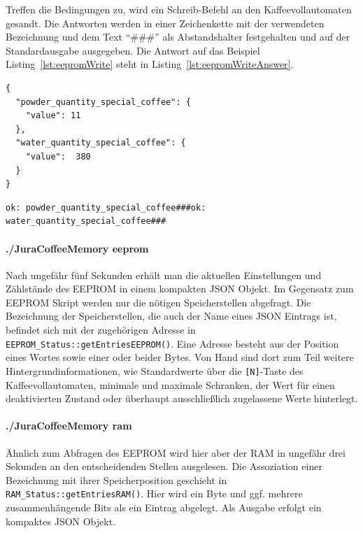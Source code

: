 Treffen die Bedingungen zu, wird ein Schreib-Befehl an den Kaffeevollautomaten gesandt.
Die Antworten werden in einer Zeichenkette mit der verwendeten Bezeichnung und dem Text "`\#\#\#"' als Abstandshalter festgehalten und auf der Standardausgabe ausgegeben.
Die Antwort auf das Beispiel Listing~\ref{lst:eepromWrite} steht in Listing~\ref{lst:eepromWriteAnswer}.

\begin{lstlisting}[label=lst:eepromWrite,caption={Beispiel einer JSON Eingabe für./JuraCoffeeMemory eepromWrite}]
{
  "powder_quantity_special_coffee": {
    "value": 11
  },
  "water_quantity_special_coffee": {
    "value":  380
  }
}
\end{lstlisting}

\begin{lstlisting}[label=lst:eepromWriteAnswer,caption={Antwort auf das Beispiel der JSON Eingabe}]
ok: powder_quantity_special_coffee###ok: water_quantity_special_coffee###
\end{lstlisting}

\paragraph{./JuraCoffeeMemory eeprom}
Nach ungefähr fünf Sekunden erhält man die aktuellen Einstellungen und Zählstände des \ac{EEPROM} in einem kompakten \ac{JSON} Objekt.
Im Gegensatz zum EEPROM Skript werden nur die nötigen Speicherstellen abgefragt.
Die Bezeichnung der Speicherstellen, die auch der Name eines \ac{JSON} Eintrags ist, befindet sich mit der zugehörigen Adresse in \texttt{EEPROM\_Status::getEntriesEEPROM()}.
Eine Adresse besteht aus der Position eines Wortes sowie einer oder beider Bytes.
Von Hand sind dort zum Teil weitere Hintergrundinformationen, wie Standardwerte über die \texttt{[N]}-Taste des Kaffeevollautomaten, minimale und maximale Schranken, der Wert für einen deaktivierten Zustand oder überhaupt ausschließlich zugelassene Werte hinterlegt.

\paragraph{./JuraCoffeeMemory ram}
Ähnlich zum Abfragen des \ac{EEPROM} wird hier aber der \ac{RAM} in ungefähr drei Sekunden an den entscheidenden Stellen ausgelesen.
Die Assoziation einer Bezeichnung mit ihrer Speicherposition geschieht in \texttt{RAM\_Status::getEntriesRAM()}.
Hier wird ein Byte und ggf. mehrere zusammenhängende Bits als ein Eintrag abgelegt.
Als Ausgabe erfolgt ein kompaktes \ac{JSON} Objekt.










